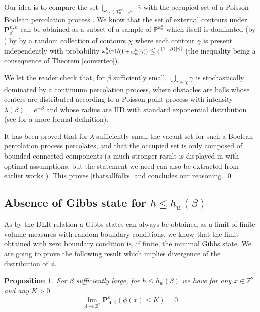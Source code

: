 \documentclass[10pt]{amsart}
\newcommand{\spfrac}[2]{\sfrac{#1}{(#2)}}
\numberwithin{equation}{section}
\theoremstyle{plain}
\newtheorem{proposition}[theorem]{Proposition}
\theoremstyle{definition}
\newcommand{\ext}{\mathrm{ext}}
\newcommand{\bP}{{\ensuremath{\mathbf P}} }
\newcommand{\bbP}{{\ensuremath{\mathbb P}} }
\newcommand{\bbZ}{{\ensuremath{\mathbb Z}} }
\newcommand{\gb}{\beta}
\newcommand{\go}{\omega}
\newcommand{\gl}{\lambda}
\newcommand{\gL}{\Lambda}
\begin{document}
Our idea is to compare the set $\bigcup_{\gamma\in \Upsilon^{\ext}_n(\phi)} \bar \gamma$ with the occupied set of a Poisson Boolean percolation process \cite{cf:ATT, cf:Hall, cf:G}.
We know that the set of external contours under $\bP^{n,h}_{\gb}$ can be obtained as a subset of a sample of $\bbP^{\go^h_n}$
which itself is dominated (\eg by \cite[Lem.\,4.4]{cf:part1}) by
by a random collection of contours $\chi$ where each contour $\gamma$ is present independently with probability
$\spfrac{\go^h_n(\gamma)}{1+\go^h_n(\gamma)}\le e^{(1-\gb) |\tilde \gamma|}$ (the inequality being a consequence of Theorem \ref{converteo}).

We let the reader check that, for $\gb$ sufficiently small, $\bigcup_{\gamma\in \chi} \bar \gamma$ is stochastically dominated by a continuum percolation process,
where obstacles are balls whose centers are distributed according to a Poisson point process with intensity $\gl(\gb)=e^{-\gb}$ and
whose radius are IID with standard exponential distribution (see \eg \cite{cf:ATT, cf:Hall, cf:G} for a more formal definition).

It has been proved that for $\gl$ sufficiently small the vacant set for such a Boolean percolation process percolates, and that the occupied set is
only composed of bounded connected components (a much stronger result is displayed in \cite[Th.\,1]{cf:ATT} with optimal assumptions,
but the statement we need can also be extracted from earlier works
\eg \cite{cf:G, cf:Hall}). This proves \eqref{thatsallfolks} and concludes our reasoning.
\qed

\subsection{Absence of Gibbs state for $h\le h_w(\gb)$ }\label{noon}

As by the DLR relation a Gibbs states can always be obtained as a limit of finite volume measures with random boundary conditions,
we know that the limit obtained with zero boundary condition is, if finite, the minimal Gibbs state.
We are going to prove the following result which implies divergence of the distribution of $\phi$.

\begin{proposition}
For $\gb$ sufficiently large, for $h\le h_w(\gb)$ we have for any $x\in \bbZ^2$ and any $K>0$
\begin{equation*}
\lim_{\gL\to \bbZ^2} \bP^{h}_{\gL,\gb}(\phi(x)\le K)=0.
\end{equation*}
\end{proposition}
\end{document}
